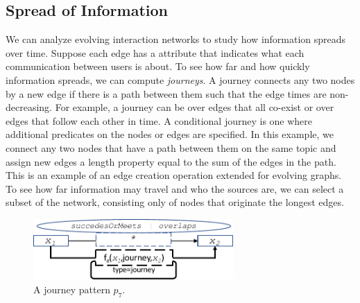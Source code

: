 \subsection{ Spread of Information} 

We can analyze evolving interaction networks to study how information
spreads over time.  Suppose each edge has a  attribute
that indicates what each communication between users is about.  To see
how far and how quickly information spreads, we can compute {\em
journeys}.  A journey connects any two nodes by a new edge if there is
a path between them such that the edge times are non-decreasing.  For
example, a journey can be over edges that all co-exist or over edges
that follow each other in time.  A conditional journey is one where
additional predicates on the nodes or edges are specified.  In this
example, we connect any two nodes that have a path between them on the
same topic and assign new edges a length property equal to the sum of
the edges in the path.  This is an example of an edge creation
operation extended for evolving graphs.  To see how far information
may travel and who the sources are, we can select a subset of the
network, consisting only of nodes that originate the longest edges.

\begin{figure}
\centering
\includegraphics[width=3in]{figs/journeys.pdf}
\caption{A journey pattern $p_7$.}
\vspace{-0.2cm}
\label{fig:journeysp}
\vspace{-0.2cm}
\end{figure}

